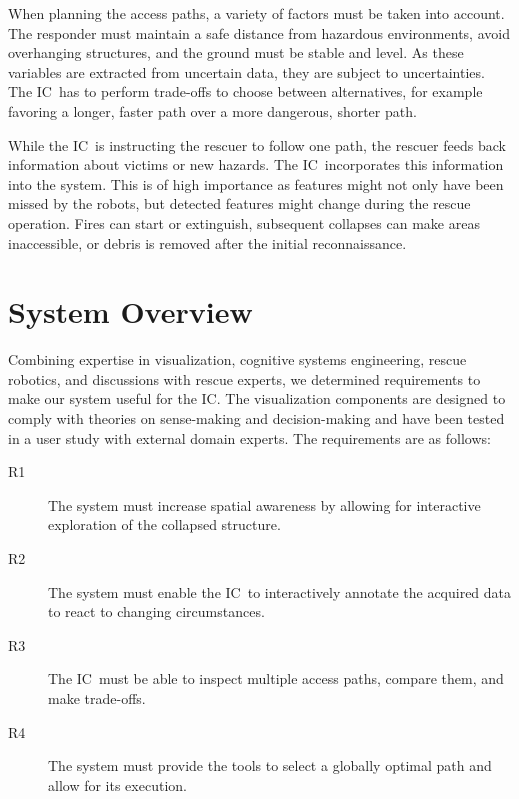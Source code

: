\documentclass{egpubl}
\def\IC{IC}
\begin{document}
When planning the access paths, a variety of factors must be taken into account. The responder must maintain a safe distance from hazardous environments, avoid overhanging structures, and the ground must be stable and level. As these variables are extracted from uncertain data, they are subject to uncertainties. The \IC\ has to perform trade-offs to choose between alternatives, for example favoring a longer, faster path over a more dangerous, shorter path.

While the \IC\ is instructing the rescuer to follow one path, the rescuer feeds back information about victims or new hazards. The \IC\ incorporates this information into the system. This is of high importance as features might not only have been missed by the robots, but detected features might change during the rescue operation. Fires can start or extinguish, subsequent collapses can make areas inaccessible, or debris is removed after the initial reconnaissance.


\section{System Overview} \label{sec:overview}

Combining expertise in visualization, cognitive systems engineering, rescue robotics, and discussions with rescue experts, we determined requirements to make our system useful for the \IC. The visualization components are designed to comply with theories on sense-making and decision-making and have been tested in a user study with external domain experts. The requirements are as follows:
\begin{description}
\item[R1] The system must increase spatial awareness by allowing for interactive exploration of the collapsed structure.
\item[R2] The system must enable the \IC\ to interactively annotate the acquired data to react to changing circumstances.
\item[R3] The \IC\ must be able to inspect multiple access paths, compare them, and make trade-offs.
\item[R4] The system must provide the tools to select a globally optimal path and allow for its execution.
\end{description}
\end{document}
